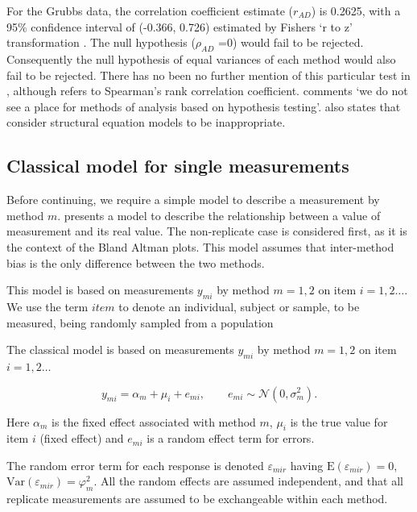 \documentclass[12pt, a4paper]{report}
\theoremstyle{plain}
\theoremstyle{definition}
\theoremstyle{remark}
\begin{document}
	For the Grubbs data, the correlation coefficient estimate
	($r_{AD}$) is 0.2625, with a 95\% confidence interval of (-0.366,
	0.726) estimated by Fishers `r to z' transformation \citep{Cohen}.
	The null hypothesis ($\rho_{AD}$ =0) would fail to be rejected.
	Consequently the null hypothesis of equal variances of each method
	would also fail to be rejected.
	There has
	no been no further mention of this particular test in
	\citet{BA86}, although \citet{BA99} refers to Spearman's rank
	correlation coefficient. \citet{BA99} comments `we do not see a
	place for methods of analysis based on hypothesis testing'.
	\citet{BA99} also states that consider structural equation models
	to be inappropriate.
	
	
	\subsection{Classical model for single measurements}
	
	
	Before continuing, we require a simple model to describe a measurement by method $m$. \citet{BXC2004} presents a model to describe the relationship between a value of measurement and its
	real value. The non-replicate case is considered first, as it is the context of the Bland Altman plots. This model assumes that inter-method bias is the only difference between the two methods.
	
	This model is based on measurements $y_{mi}$ by method $m=1,2$ on item $i = 1,2 \ldots$. We use the term $item$ to denote an individual, subject or sample, to be measured, being randomly sampled from a population
	
	
	The classical model is based on measurements $y_{mi}$ by method $m=1,2$ on item $i = 1,2 \ldots$
	
	\begin{equation}
	y_{mi}  = \alpha_{m} + \mu_{i} + e_{mi}, \qquad  e_{mi} \sim
	\mathcal{N}(0,\sigma^{2}_{m}).
	\end{equation}
	
	
	Here $\alpha_m$ is the fixed effect associated with method $m$,
	$\mu_i$ is the true value for item $i$ (fixed effect) and $e_{mi}$ is a random effect term for errors.
	
	The random error term for each response is denoted $\varepsilon_{mir}$ having $\mathrm{E}(\varepsilon_{mir})=0$, $\mathrm{Var}(\varepsilon_{mir})=\varphi^2_m$. All the random effects are assumed independent, and that all replicate measurements are assumed to be exchangeable within each method.
	
\end{document}

